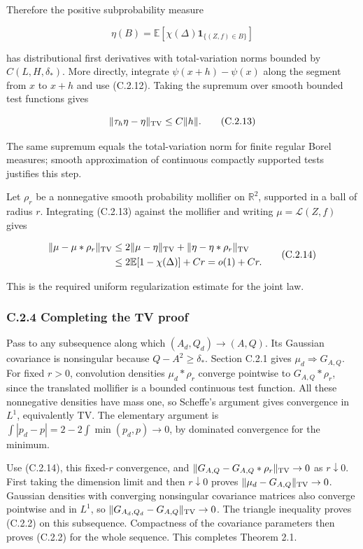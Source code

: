 \documentclass[
  11pt,
  a4paper,
]{article}
\begin{document}
Therefore the positive subprobability measure

\[
\eta(B)=\mathbb E[\chi(\Delta)\mathbf1_{\{(Z,f)\in B\}}]
\]

has distributional first derivatives with total-variation norms bounded
by \(C(L,H,\delta_*)\). More directly, integrate \(\psi(x+h)-\psi(x)\)
along the segment from \(x\) to \(x+h\) and use (C.2.12). Taking the
supremum over smooth bounded test functions gives

\[
\|\tau_h\eta-\eta\|_{\rm TV}\le C\|h\|.
\tag{C.2.13}
\]

The same supremum equals the total-variation norm for finite regular
Borel measures; smooth approximation of continuous compactly supported
tests justifies this step.

Let \(\rho_r\) be a nonnegative smooth probability mollifier on
\(\mathbb R^2\), supported in a ball of radius \(r\). Integrating
(C.2.13) against the mollifier and writing \(\mu=\mathcal L(Z,f)\) gives

\[
\begin{aligned}
\|\mu-\mu*\rho_r\|_{\rm TV}
&\le2\|\mu-\eta\|_{\rm TV}
       +\|\eta-\eta*\rho_r\|_{\rm TV}\\
&\le2\mathbb E[1-\chi(\Delta)]+Cr
 =o(1)+Cr.
\end{aligned}
\tag{C.2.14}
\]

This is the required uniform regularization estimate for the joint law.

\hypertarget{c.2.4-completing-the-tv-proof}{%
\subsubsection{C.2.4 Completing the TV
proof}\label{c.2.4-completing-the-tv-proof}}

Pass to any subsequence along which \((A_d,Q_d)\to(A,Q)\). Its Gaussian
covariance is nonsingular because \(Q-A^2\ge\delta_*\). Section C.2.1
gives \(\mu_d\Rightarrow G_{A,Q}\). For fixed \(r>0\), convolution
densities \(\mu_d*\rho_r\) converge pointwise to \(G_{A,Q}*\rho_r\),
since the translated mollifier is a bounded continuous test function.
All these nonnegative densities have mass one, so Scheffe's argument
gives convergence in \(L^1\), equivalently TV. The elementary argument
is \(\int|p_d-p|=2-2\int\min(p_d,p)\to0\), by dominated convergence for
the minimum.

Use (C.2.14), this fixed-\(r\) convergence, and
\(\|G_{A,Q}-G_{A,Q}*\rho_r\|_{\rm TV}\to0\) as \(r\downarrow0\). First
taking the dimension limit and then \(r\downarrow0\) proves
\(\|\mu_d-G_{A,Q}\|_{\rm TV}\to0\). Gaussian densities with converging
nonsingular covariance matrices also converge pointwise and in \(L^1\),
so \(\|G_{A_d,Q_d}-G_{A,Q}\|_{\rm TV}\to0\). The triangle inequality
proves (C.2.2) on this subsequence. Compactness of the covariance
parameters then proves (C.2.2) for the whole sequence. This completes
Theorem 2.1.
\end{document}
